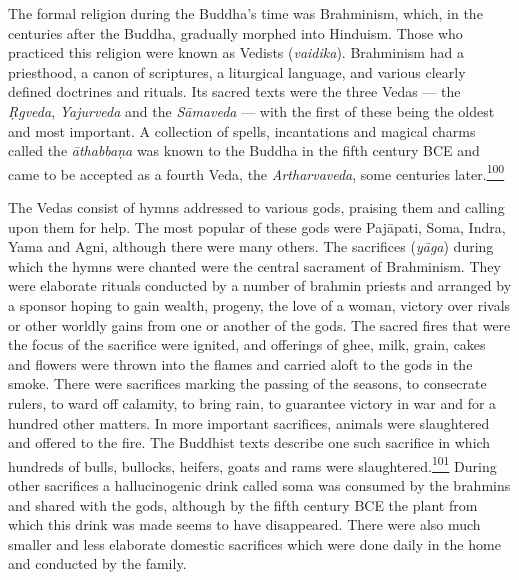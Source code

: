 The formal religion during the Buddha's time was Brahminism, which, in
the centuries after the Buddha, gradually morphed into Hinduism. Those
who practiced this religion were known as Vedists (\emph{vaidika}).
Brahminism had a priesthood, a canon of scriptures, a liturgical
language, and various clearly defined doctrines and rituals. Its sacred
texts were the three Vedas --- the \emph{Ṛgveda}, \emph{Yajurveda} and
the \emph{Sāmaveda} --- with the first of these being the oldest and
most important. A collection of spells, incantations and magical charms
called the \emph{āthabbaṇa} was known to the Buddha in the fifth century
BCE and came to be accepted as a fourth Veda, the \emph{Artharvaveda},
some centuries
later.\label{footprints_split_007.html_fnref100}\hyperref[footprints_split_024.htmlux5cux23fn100]{\textsuperscript{100}}

The Vedas consist of hymns addressed to various gods, praising them and
calling upon them for help. The most popular of these gods were
Pajāpati, Soma, Indra, Yama and Agni, although there were many others.
The sacrifices (\emph{yāga}) during which the hymns were chanted were
the central sacrament of Brahminism. They were elaborate rituals
conducted by a number of brahmin priests and arranged by a sponsor
hoping to gain wealth, progeny, the love of a woman, victory over rivals
or other worldly gains from one or another of the gods. The sacred fires
that were the focus of the sacrifice were ignited, and offerings of
ghee, milk, grain, cakes and flowers were thrown into the flames and
carried aloft to the gods in the smoke. There were sacrifices marking
the passing of the seasons, to consecrate rulers, to ward off calamity,
to bring rain, to guarantee victory in war and for a hundred other
matters. In more important sacrifices, animals were slaughtered and
offered to the fire. The Buddhist texts describe one such sacrifice in
which hundreds of bulls, bullocks, heifers, goats and rams were
slaughtered.\label{footprints_split_007.html_fnref101}\hyperref[footprints_split_024.htmlux5cux23fn101]{\textsuperscript{101}}
During other sacrifices a hallucinogenic drink called soma was consumed
by the brahmins and shared with the gods, although by the fifth century
BCE the plant from which this drink was made seems to have disappeared.
There were also much smaller and less elaborate domestic sacrifices
which were done daily in the home and conducted by the family.

